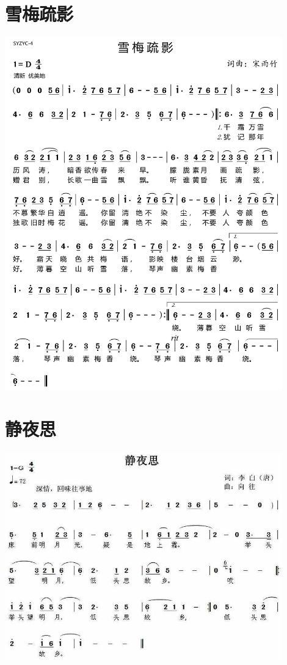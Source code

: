 \documentclass[cn,pad,twocol]{elegantbook}
\begin{document}
\section{雪梅疏影}
    \includegraphics[width=0.9\textwidth]{dongxiao/20200725-雪梅疏影}
\section{静夜思}
    \includegraphics[width=0.9\textwidth]{dongxiao/20200411-静夜思}
\end{document}
